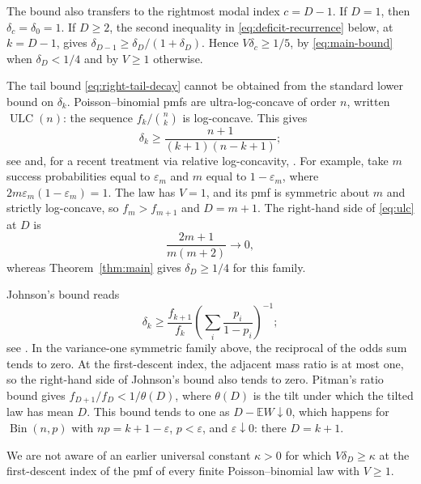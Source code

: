 \documentclass[ECP,preprint]{ejpecp}
\begin{document}
The bound also transfers to the rightmost modal index $c=D-1$. If $D=1$, then
$\delta_c=\delta_0=1$. If $D\geq2$, the second inequality in
\eqref{eq:deficit-recurrence} below, at $k=D-1$, gives
$\delta_{D-1}\geq\delta_D/(1+\delta_D)$. Hence $V\delta_c\geq1/5$, by
\eqref{eq:main-bound} when $\delta_D<1/4$ and by $V\geq1$ otherwise.

The tail bound \eqref{eq:right-tail-decay} cannot be obtained from the
standard lower bound on $\delta_k$. Poisson--binomial pmfs are
ultra-log-concave of order $n$, written $\operatorname{ULC}(n)$: the sequence
$f_k/\binom nk$ is log-concave. This gives
\begin{equation}\label{eq:ulc}
  \delta_k\geq
  \frac{n+1}{(k+1)(n-k+1)};
\end{equation}
see \cite[Definition~3.11 and equation~(41)]{hillionjohnson2016} and, for a
recent treatment via relative log-concavity,
\cite[the discussion following Definition~1.3]{marsigliettimelbourne2026}.
For example, take $m$ success probabilities equal to $\varepsilon_m$ and $m$
equal to $1-\varepsilon_m$, where $2m\varepsilon_m(1-\varepsilon_m)=1$. The
law has $V=1$, and its pmf is symmetric about $m$ and strictly log-concave,
so $f_m>f_{m+1}$ and $D=m+1$. The right-hand side of \eqref{eq:ulc} at $D$
is
\[
  \frac{2m+1}{m(m+2)}\longrightarrow0,
\]
whereas Theorem~\ref{thm:main} gives $\delta_D\geq1/4$ for this family.

Johnson's bound reads
\[
  \delta_k\geq \frac{f_{k+1}}{f_k}
  \left(\sum_i\frac{p_i}{1-p_i}\right)^{-1};
\]
see \cite[Definition~1.2, Lemma~5.1, and
Example~5.2(2)]{johnson2017discrete}. In the variance-one symmetric family
above, the reciprocal of the odds sum tends to zero. At the first-descent
index, the adjacent mass ratio is at most one, so the right-hand side of
Johnson's bound also tends to zero. Pitman's ratio bound
\cite[equation~(21)]{pitman1997} gives $f_{D+1}/f_D<1/\theta(D)$, where
$\theta(D)$ is the tilt under which the tilted law has mean $D$. This bound
tends to one as $D-\mathbb EW\downarrow0$, which happens for
$\operatorname{Bin}(n,p)$ with $np=k+1-\varepsilon$, $p<\varepsilon$, and
$\varepsilon\downarrow0$: there $D=k+1$.

We are not aware of an earlier universal constant $\kappa>0$ for which
$V\delta_D\geq\kappa$ at the first-descent index of the pmf of every finite
Poisson--binomial law with $V\geq1$.
\end{document}
